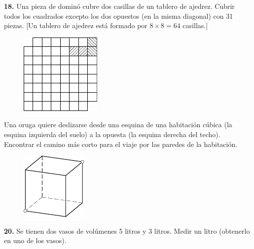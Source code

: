\documentclass[12pt]{article}  %
\begin{document}
\medskip\noindent
{\bf 18.} Una pieza de domin\'o cubre dos casillas de un tablero de ajedrez. 
Cubrir todos los cuadrados excepto los dos opuestos (en la misma diagonal) con 31 piezas. [Un tablero de ajedrez est\'a formado por $8 \times 8 = 64$ casillas.]
\begin{figure}[h]
\centering
\footnotesize
\includegraphics[scale=1]{taskbook-2}
\end{figure}

 Una oruga quiere deslizarse desde una esquina de una habitaci\'on c\'ubica (la esquina izquierda del suelo) a la opuesta (la esquina derecha del techo).
Encontrar el camino m\'as corto para el viaje por las paredes de la habitaci\'on.
\begin{figure}[h]
\centering
\footnotesize
\includegraphics[scale=1]{taskbook-3}
\end{figure}
\newline\newline\quad
{\bf 20.} Se tienen dos vasos de vol\'umenes 5 litros y 3 litros. Medir un litro (obtenerlo en uno de los vasos).
\end{document}
